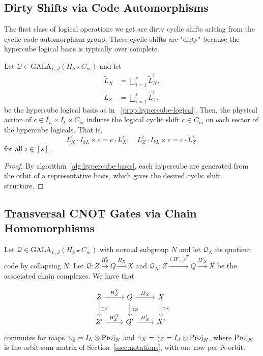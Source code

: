 \subsection{Dirty Shifts via Code Automorphisms}
The first class of logical operations we get are dirty cyclic shifts arising from the cyclic code automorphism group. These cyclic shifts are "dirty" because the hypercube logical basis is typically over complete.

\begin{proposition}
Let $\mathcal{Q}\in \mathrm{GALA}_{L,J}(H_k\star C_m)$ and let \begin{align*}
            \tilde L_X &= \bigsqcup_{i = 1}^s \tilde L_X^i, \\
        \tilde L_Z &= \bigsqcup_{i = 1}^s \tilde L_Z^i,
\end{align*}
be the hypercube logical basis as in ~\ref{prop:hypercube-logical}. Then, the physical action of $c\in I_L\times I_k\times C_m$ induces the logical cyclic shift $\bar c \in C_m$ on each sector of the hypercube logicals. That is,
\begin{equation}
     L_X^i\cdot I_{kL}\times c = c\cdot  L_X^i;\quad 
     L_Z^i\cdot I_{kL}\times c = c\cdot  L_Z^i.
\end{equation}
for all $i\in [s]$.
\end{proposition}
\begin{proof}
By algorithm~\ref{alg:hypercube-basis}, each hypercube are generated from the orbit of a representative basis, which gives the desired cyclic shift structure.
\end{proof}
\subsection{Transversal CNOT Gates via Chain Homomorphisms}
\begin{proposition}\label{prop:q-homo}
Let $\mathcal{Q}\in \mathrm{GALA}_{L,J}(H_k\star C_m)$ with normal subgroup $N$ and let $\mathcal{Q}_N$ its quotient code by collapsing $N$. Let $\mathcal{Q}: Z\xrightarrow{H_Z^T} Q\xrightarrow{H_X} X$ and $\mathcal{Q}_N: Z\xrightarrow{(H'_Z)^T} Q\xrightarrow{H'_X} X$ be the associated chain complexes. We have that 


\begin{equation}
    \begin{tikzcd}[ampersand replacement=\&]
        {Z} \& {Q} \& {X} \\
        {Z'} \& {Q'} \& {X'}
        \arrow["{H_Z^T}", from=1-1, to=1-2]
        \arrow["{H_X}", from=1-2, to=1-3]
        \arrow["{H_Z'^T}", from=2-1, to=2-2]
        \arrow["{H_X'}", from=2-2, to=2-3]
        \arrow["{\gamma_Z}", from=1-1, to=2-1]
        \arrow["{\gamma_Q}", from=1-2, to=2-2]
        \arrow["{\gamma_X}", from=1-3, to=2-3]
    \end{tikzcd}
\end{equation}
commutes for maps $\gamma_Q = I_L\otimes\mathrm{Proj}_N$ and $\gamma_X = \gamma_Z = I_J\otimes\mathrm{Proj}_N$, where $\mathrm{Proj}_N$ is the orbit-sum matrix of Section~\ref{ssec:notations}, with one row per $N$-orbit.
\end{proposition}

